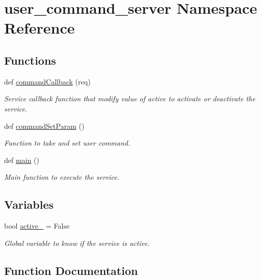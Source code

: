 \hypertarget{namespaceuser__command__server}{}\section{user\+\_\+command\+\_\+server Namespace Reference}
\label{namespaceuser__command__server}
\subsection*{Functions}
\begin{DoxyCompactItemize}
\item 
def \hyperlink{namespaceuser__command__server_a75450b4c73558539044916fd7da67033}{command\+Callback} (req)
\begin{DoxyCompactList}\small\item\em Service callback function that modify value of active to activate or deactivate the service. \end{DoxyCompactList}\item 
def \hyperlink{namespaceuser__command__server_a6876de90bb632c105f43dbf56477b132}{command\+Set\+Param} ()
\begin{DoxyCompactList}\small\item\em Function to take and set user command. \end{DoxyCompactList}\item 
def \hyperlink{namespaceuser__command__server_a74a796c8d060db7b3d635c58382733a7}{main} ()
\begin{DoxyCompactList}\small\item\em Main function to execute the service. \end{DoxyCompactList}\end{DoxyCompactItemize}
\subsection*{Variables}
\begin{DoxyCompactItemize}
\item 
bool \hyperlink{namespaceuser__command__server_ab82cb63aa559c128e8101fed0670b8b6}{active\+\_\+} = False
\begin{DoxyCompactList}\small\item\em Global variable to know if the service is active. \end{DoxyCompactList}\end{DoxyCompactItemize}


\subsection{Function Documentation}
